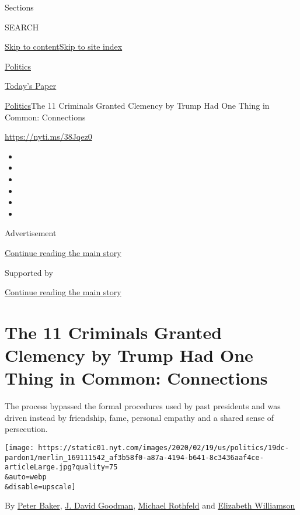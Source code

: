 Sections

SEARCH

\protect\hyperlink{site-content}{Skip to
content}\protect\hyperlink{site-index}{Skip to site index}

\href{https://www.nytimes.com/section/politics}{Politics}

\href{https://myaccount.nytimes.com/auth/login?response_type=cookie\&client_id=vi}{}

\href{https://www.nytimes.com/section/todayspaper}{Today's Paper}

\href{/section/politics}{Politics}\textbar{}The 11 Criminals Granted
Clemency by Trump Had One Thing in Common: Connections

\url{https://nyti.ms/38Jqez0}

\begin{itemize}
\item
\item
\item
\item
\item
\item
\end{itemize}

Advertisement

\protect\hyperlink{after-top}{Continue reading the main story}

Supported by

\protect\hyperlink{after-sponsor}{Continue reading the main story}

\hypertarget{the-11-criminals-granted-clemency-by-trump-had-one-thing-in-common-connections}{%
\section{The 11 Criminals Granted Clemency by Trump Had One Thing in
Common:
Connections}\label{the-11-criminals-granted-clemency-by-trump-had-one-thing-in-common-connections}}

The process bypassed the formal procedures used by past presidents and
was driven instead by friendship, fame, personal empathy and a shared
sense of persecution.

\texttt{[image: https://static01.nyt.com/images/2020/02/19/us/politics/19dc-pardon1/merlin\_169111542\_af3b58f0-a87a-4194-b641-8c3436aaf4ce-articleLarge.jpg?quality=75\\\&auto=webp\\\&disable=upscale]}

By \href{https://www.nytimes.com/by/peter-baker}{Peter Baker},
\href{https://www.nytimes.com/by/j-david-goodman}{J. David Goodman},
\href{https://www.nytimes.com/by/michael-rothfeld}{Michael Rothfeld} and
\href{https://www.nytimes.com/by/elizabeth-williamson}{Elizabeth
Williamson}

